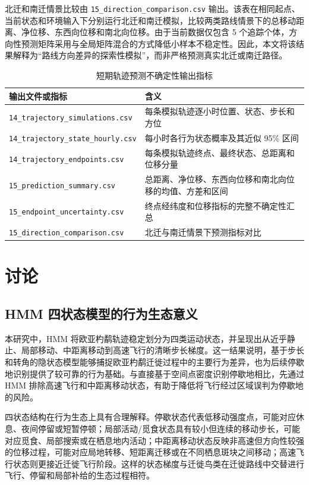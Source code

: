 \documentclass[UTF8,a4paper,12pt]{ctexart}
\begin{document}
北迁和南迁情景比较由 \texttt{15\_direction\_comparison.csv} 输出。该表在相同起点、当前状态和环境输入下分别运行北迁和南迁模拟，比较两类路线情景下的总移动距离、净位移、东西向位移和南北向位移。由于当前数据仅包含 5 个追踪个体，方向性预测矩阵采用与全局矩阵混合的方式降低小样本不稳定性。因此，本文将该结果解释为“路线方向差异的探索性模拟”，而非严格预测真实北迁或南迁路径。

\begin{table}[H]
  \centering
  \caption{短期轨迹预测不确定性输出指标}
  \label{tab:predictionoutputs}
  \scriptsize
  \begin{tabular}{p{}p{}}
    \toprule
    输出文件或指标 & 含义 \\
    \midrule
    \texttt{14\_trajectory\_simulations.csv} & 每条模拟轨迹逐小时位置、状态、步长和方位 \\
    \texttt{14\_trajectory\_state\_hourly.csv} & 每小时各行为状态概率及其近似 95\% 区间 \\
    \texttt{14\_trajectory\_endpoints.csv} & 每条模拟轨迹终点、最终状态、总距离和位移分量 \\
    \texttt{15\_prediction\_summary.csv} & 总距离、净位移、东西向位移和南北向位移的均值、方差和区间 \\
    \texttt{15\_endpoint\_uncertainty.csv} & 终点经纬度和位移指标的完整不确定性汇总 \\
    \texttt{15\_direction\_comparison.csv} & 北迁与南迁情景下预测指标对比 \\
    \bottomrule
  \end{tabular}
\end{table}

\section{讨论}

\subsection{HMM 四状态模型的行为生态意义}

本研究中，HMM 将欧亚杓鹬轨迹稳定划分为四类运动状态，并呈现出从近乎静止、局部移动、中距离移动到高速飞行的清晰步长梯度。这一结果说明，基于步长和转角的隐状态模型能够捕捉欧亚杓鹬迁徙过程中的主要行为差异，也为后续停歇地识别提供了较可靠的行为基础。与直接基于空间点密度识别停歇地相比，先通过 HMM 排除高速飞行和中距离移动状态，有助于降低将飞行经过区域误判为停歇地的风险。

四状态结构在行为生态上具有合理解释。停歇状态代表低移动强度点，可能对应休息、夜间停留或短暂停顿；局部活动/觅食状态具有较小但连续的移动步长，可能对应觅食、局部搜索或在栖息地内活动；中距离移动状态反映非高速但方向性较强的位移过程，可能对应局地转移、短距离迁移或在不同栖息斑块之间移动；高速飞行状态则更接近迁徙飞行阶段。这样的状态梯度与迁徙鸟类在迁徙路线中交替进行飞行、停留和局部补给的生态过程相符。
\end{document}
